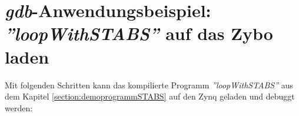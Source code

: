 


\section{\textit{gdb}-Anwendungsbeispiel: \textit{''loopWithSTABS''} auf das Zybo laden}
\label{section:anwendungsbeispielGdb}
Mit folgenden Schritten kann das kompilierte Programm \textit{''loopWithSTABS''} aus dem Kapitel \ref{section:demoprogrammSTABS} auf den Zynq geladen und debuggt werden:

